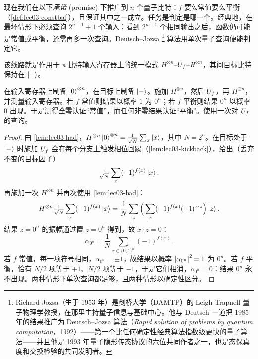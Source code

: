现在我们在以下\emph{承诺} (promise) 下推广到 $n$ 个量子比特：$f$ 要么常值要么平衡（\cref{def:lec03-constbal}），且保证其中之一成立。任务是判定是哪一个。经典地，在最坏情形下必须查询 $2^{n-1}+1$ 个输入：看到 $2^{n-1}$ 个相同输出之后，函数仍可能是常值或平衡，还需再多一次查询。Deutsch--Jozsa%
\footnote{Richard Jozsa（生于 1953 年）是剑桥大学（DAMTP）的 Leigh Trapnell 量子物理学教授，在那里主持量子信息与基础中心。他与 Deutsch 一道把 1985 年的结果推广为 Deutsch--Jozsa 算法（\emph{Rapid solution of problems by quantum computation}，1992）——第一个比任何确定性经典算法指数级更快的量子算法——并且他是 1993 年量子隐形传态协议的六位共同作者之一，也是态保真度和交换检验的共同发明者。}
算法用单次量子查询便能判定它。

该线路就是作用于 $n$ 比特输入寄存器上的统一模式 $H^{\otimes n}$--$U_{f}$--$H^{\otimes n}$，其间目标比特保持在 $\ket{-}$。

\begin{theorem}
\label{thm:lec03-dj}
在输入寄存器上制备 $\ket{0}^{\otimes n}$，在目标上制备 $\ket{-}$。施加 $H^{\otimes n}$，然后 $U_{f}$，再 $H^{\otimes n}$，并测量输入寄存器。若 $f$ 常值则结果以概率 $1$ 为 $0^n$；若 $f$ 平衡则结果 $0^n$ 以概率 $0$ 出现。于是测得全零认证“常值”，而任何非零结果认证“平衡”。使用一次对 $U_{f}$ 的查询。
\end{theorem}

\begin{proof}
由 \cref{lem:lec03-had}，$H^{\otimes n}\ket{0}^{\otimes n}
=\tfrac{1}{\sqrt N}\sum_{x}\ket{x}$，其中 $N=2^n$。在目标处于 $\ket{-}$ 时施加 $U_{f}$ 会在每个分支上触发相位回踢（\cref{lem:lec03-kickback}），给出（丢弃不变的目标因子）
\[
  \tfrac{1}{\sqrt N}\sum_{x}(-1)^{f(x)}\ket{x}.
\]
再施加一次 $H^{\otimes n}$ 并再次使用 \cref{lem:lec03-had}：
\[
  H^{\otimes n}\tfrac{1}{\sqrt N}\sum_{x}(-1)^{f(x)}\ket{x}
  =\frac{1}{N}\sum_{z}\Big(\sum_{x}(-1)^{f(x)}(-1)^{x\cdot z}\Big)\ket{z}.
\]
结果 $z=0^n$ 的振幅通过置 $z=0^n$ 得到，故 $x\cdot z=0$：
\[
  \alpha_{0^n}=\frac{1}{N}\sum_{x\in\{0,1\}^n}(-1)^{f(x)}.
\]
若 $f$ 常值，每一项符号相同，$\alpha_{0^n}=\pm1$，故结果以概率 $\left\lvert \alpha_{0^n} \right\rvert^2=1$ 为 $0^n$。若 $f$ 平衡，恰有 $N/2$ 项等于 $+1$、$N/2$ 项等于 $-1$，于是它们相消，$\alpha_{0^n}=0$：结果 $0^n$ 永不出现。两种情形下单次查询都足够，且两种情形以确定性区分。
\end{proof}

